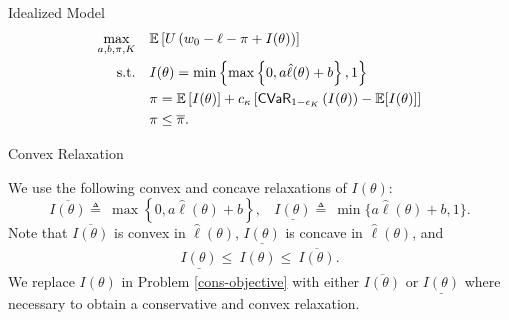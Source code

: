 \documentclass{beamer}
\begin{document}
\begin{frame}{Idealized Model}
\label{ideal-model}
\begin{align}
    \max_{a,b,\pi, K}  & \quad \mathbb{E} \left [ U\left ( w_0 - \ell - \pi + I(\theta) \right ) \right ] \label{cons-objective}\\
    \text{s.t.} & \quad I(\theta) =  \min \left \{\max \left \{0,a\hat{\ell}(\theta) + b \right \}, 1 \right \}\label{cons-contract}\\
    & \quad \pi = \mathbb{E}\left [ I(\theta) \right ] + c_{\kappa} \left[ {\sf CVaR}_{1-\epsilon_K}\left ( I(\theta)\right )  - \mathbb{E}[I(\theta)]  \right] \\
    &\quad \pi \leq \overline{\pi}.\label{cons-capital}
\end{align}
\end{frame}

\begin{frame}{Convex Relaxation}

    We use the following convex and concave relaxations of $I(\theta)$: 
    \[
    \overline{I(\theta)} \triangleq\ \max \left \{ 0,a\hat{\ell}(\theta) + b\right \},\ \ \ \ 
    \underline{I(\theta)} \triangleq\ \min \{ a\hat{\ell}(\theta) + b,1 \}.
    \]
    Note that $\overline{I(\theta)}$ is convex in $\hat{\ell}(\theta)$, $\underline{I(\theta)}$ is concave in $\hat{\ell}(\theta)$, and
    \begin{align*}
    \underline{I(\theta)} \leq\ I(\theta) \leq\ \overline{I(\theta)}.
    \end{align*}
 We replace $I(\theta)$ in Problem \eqref{cons-objective} with either $\overline{I(\theta)}$ or $\underline{I(\theta)}$ where necessary to obtain a conservative and convex relaxation. 
\end{frame}
\end{document}
